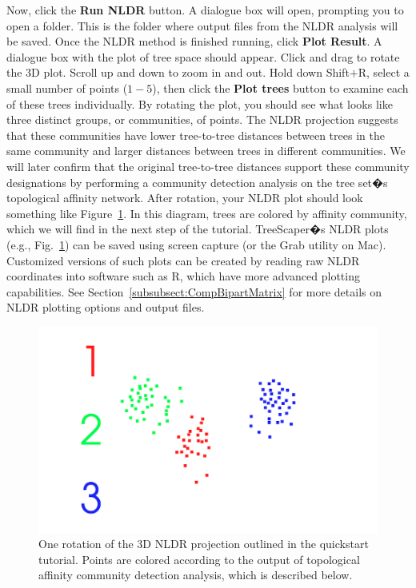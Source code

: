 \documentclass[11pt]{article}
\begin{document}
Now, click the {\bf Run NLDR} button. A dialogue box will open, prompting you to open a folder. This is the folder where output files from the NLDR analysis will be saved. Once the NLDR method is finished running, click {\bf Plot Result}.  A dialogue box with the plot of tree space should appear.  Click and drag to rotate the 3D plot. Scroll up and down to zoom in and out. Hold down Shift$+$R, select a small number of points ($1-5$), then click the {\bf Plot trees} button to examine each of these trees individually. By rotating the plot, you should see what looks like three distinct groups, or communities, of points.  The NLDR projection suggests that these communities have lower tree-to-tree distances between trees in the same community and larger distances between trees in different communities.  We will later confirm that the original tree-to-tree distances support these community designations by performing a community detection analysis on the tree set�s topological affinity network. After rotation, your NLDR plot should look something like Figure~\ref{fig4}.  In this diagram, trees are colored by affinity community, which we will find in the next step of the tutorial. TreeScaper�s NLDR plots (e.g., Fig.~\ref{fig4}) can be saved using screen capture (or the Grab utility on Mac). Customized versions of such plots can be created by reading raw NLDR coordinates into software such as R, which have more advanced plotting capabilities. See Section~\ref{subsubsect:CompBipartMatrix} for more details on NLDR plotting options and output files. \\

\begin{figure}[thbp!]\centering
\includegraphics[scale=0.25]{imagesForManual/Figure4.png}
\caption{One rotation of the 3D NLDR projection outlined in the quickstart tutorial. Points are colored according to the output of topological affinity community detection analysis, which is described below.}\label{fig4}
\end{figure}
\end{document}
